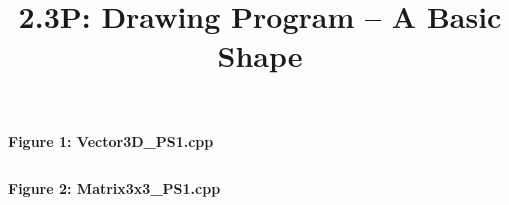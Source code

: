 \documentclass[12pt, letterpaper]{article}
\title{2.3P: Drawing Program -- A Basic Shape}
\author{}
\date{}
\newcommand{\includeminted}[3]
{
  \begin{center}
  \textbf{#1}
  \vspace{-5pt}
  \inputminted[linenos, breaklines]{#2}{#3}
  \end{center}
}
\begin{document}
\normalsize
\includeminted{Figure 1: Vector3D\_PS1.cpp}{csharp}{../src/Vector3D_PS1.cpp}
\clearpage
\includeminted{Figure 2: Matrix3x3\_PS1.cpp}{csharp}{../src/Matrix3x3_PS1.cpp}
\end{document}
